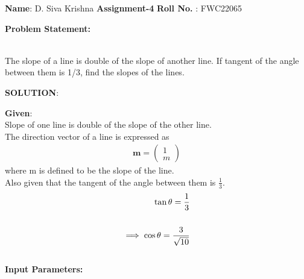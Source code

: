 \documentclass[10pt,a4paper]{report}
\newcommand{\myvec}[1]{\ensuremath{\begin{pmatrix}#1\end{pmatrix}}}
\let\vec\mathbf
\let\vec\mathbf
\begin{document}
\raggedright \textbf{Name}:\hspace{1mm} D. Siva Krishna\hspace{3cm} \Large \textbf{Assignment-4}\hspace{2.5cm} %
\normalsize \textbf{Roll No.} :\hspace{1mm} FWC22065\vspace{1cm}
\begin{multicols}{2}

\raggedright \textbf{Problem Statement:}\vspace{2mm}
\raggedright \\The slope of a line is double of the slope of another line. If tangent of the angle between them is 1/3, find the slopes of the lines.\\
\vspace{5mm}
\raggedright \textbf{SOLUTION}:\vspace{2mm}\\

\raggedright \textbf{Given}:\vspace{2mm}\\
Slope of one line is double of the slope of the other line. \\\vspace{1mm}
The direction vector of a line is expressed as
\\
\begin{align}
\vec{m}=\myvec{1\\m}
\end{align}
where  m is defined to be the slope of the line.\\
\vspace{2mm}
 Also given that the tangent of the angle between them is $\frac{1}{3}$.   \\
\begin{align}
\tan \theta = \frac{1}{3}\\
\vspace{2mm}
\\
\implies \cos \theta=\frac{3}{\sqrt{10}}
\end{align}
\\
\textbf{Input Parameters:}
\vspace{2mm}



\end{multicols}
\end{document}
